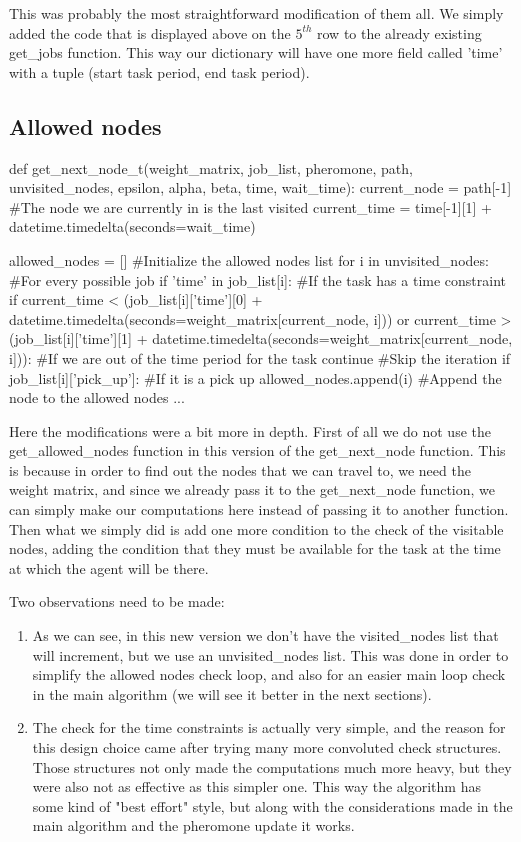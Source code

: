\documentclass[titlepage]{article}
\begin{document}
This was probably the most straightforward modification of them all. We simply added the code that is displayed above on the $5^{th}$ row to the already existing get\_jobs function. This way our dictionary will have one more field called 'time' with a tuple (start task period, end task period).

\subsection{Allowed nodes}

\begin{python}
def get_next_node_t(weight_matrix, job_list, pheromone, path, unvisited_nodes, epsilon, alpha, beta, time, wait_time):
    current_node = path[-1] #The node we are currently in is the last visited
    current_time = time[-1][1] + datetime.timedelta(seconds=wait_time)

    allowed_nodes = [] #Initialize the allowed nodes list
    for i in unvisited_nodes: #For every possible job
        if 'time' in job_list[i]: #If the task has a time constraint
            if current_time < (job_list[i]['time'][0] + datetime.timedelta(seconds=weight_matrix[current_node, i])) or current_time > (job_list[i]['time'][1] + datetime.timedelta(seconds=weight_matrix[current_node, i])): #If we are out of the time period for the task
                continue #Skip the iteration
        if job_list[i]['pick_up']: #If it is a pick up
            allowed_nodes.append(i) #Append the node to the allowed nodes
    ...
\end{python}

Here the modifications were a bit more in depth. First of all we do not use the get\_allowed\_nodes function in this version of the get\_next\_node function. This is because in order to find out the nodes that we can travel to, we need the weight matrix, and since we already pass it to the get\_next\_node function, we can simply make our computations here instead of passing it to another function. Then what we simply did is add one more condition to the check of the visitable nodes, adding the condition that they must be available for the task at the time at which the agent will be there.

Two observations need to be made:
\begin{enumerate}
    \item As we can see, in this new version we don't have the visited\_nodes list that will increment, but we use an unvisited\_nodes list. This was done in order to simplify the allowed nodes check loop, and also for an easier main loop check in the main algorithm (we will see it better in the next sections).
    \item The check for the time constraints is actually very simple, and the reason for this design choice came after trying many more convoluted check structures. Those structures not only made the computations much more heavy, but they were also not as effective as this simpler one. This way the algorithm has some kind of "best effort" style, but along with the considerations made in the main algorithm and the pheromone update it works.
\end{enumerate}
\end{document}
